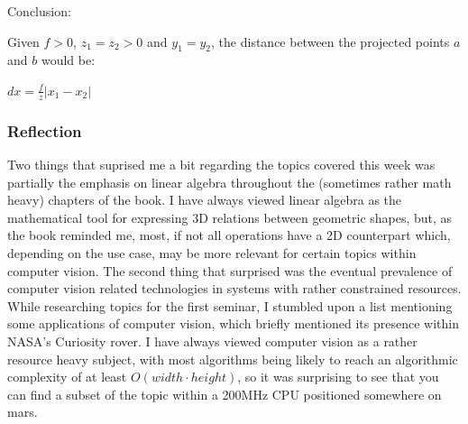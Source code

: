 \documentclass[a4paper, titlepage,12pt]{article}
\begin{document}
	\begin{center}
	\end{center}
	Conclusion:

	Given $f > 0$, $z_1 = z_2 > 0$ and $y_1 = y_2$, the distance between the projected points $a$ and $b$ would be:
	\begin{center}
	$dx = \frac{f}{z}|x_1-x_2|$
	\end{center}

\subsubsection*{Reflection}

Two things that suprised me a bit regarding the topics covered this week was partially the emphasis on linear algebra throughout the (sometimes rather math heavy) chapters of the book. I have always viewed linear algebra as the mathematical tool for expressing 3D relations between geometric shapes, but, as the book reminded me, most, if not all operations have a 2D counterpart which, depending on the use case, may be more relevant for certain topics within computer vision. The second thing that surprised was the eventual prevalence of computer vision related technologies in systems with rather constrained resources. While researching topics for the first seminar, I stumbled upon a list mentioning some applications of computer vision, which briefly mentioned its presence within NASA's Curiosity rover. I have always viewed computer vision as a rather resource heavy subject, with most algorithms being likely to reach an algorithmic complexity of at least $O(width \cdot height)$, so it was surprising to see that you can find a subset of the topic within a 200MHz CPU positioned somewhere on mars.
\end{document}
